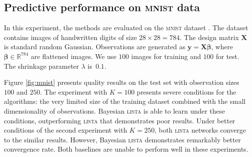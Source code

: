 \documentclass{article}
\begin{document}
  \subsection{Predictive performance on \textsc{mnist} data}
  In this experiment, the methods are evaluated on the \textsc{mnist} dataset \cite{lecun1998gradient}. The dataset contains images of handwritten digits of size $28 \times 28 = 784$. The design matrix $\mathbf{X}$ is standard random Gaussian. Observations are generated as $\mathbf{y} = \mathbf{X}\boldsymbol\beta$, where $\boldsymbol\beta \in \mathbb{R}^{784}$ are flattened images. We use $100$ images for training and $100$ for test. The shrinkage parameter $\lambda$ is~$0.1$.
  
  Figure \ref{fig:mnist} presents quality results on the test set with observation sizes $100$ and $250$. The experiment with $K=100$ presents severe conditions for the algorithms: the very limited size of the training dataset combined with the small dimensionality of observations. Bayesian \textsc{lista} is able to learn under these conditions, outperforming \textsc{lista} that demonstrates poor results. Under better conditions of the second experiment with $K=250$, both \textsc{lista} networks converge to the similar results. However, Bayesian \textsc{lista} demonstrates remarkably better convergence rate. Both baselines are unable to perform well in these experiments.
  
\end{document}
